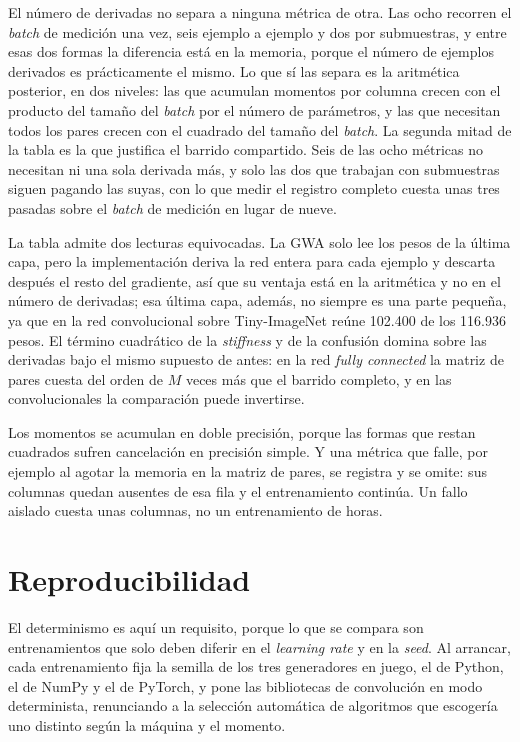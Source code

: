 El número de derivadas no separa a ninguna métrica de otra. Las ocho recorren el \emph{batch} de medición una vez, seis ejemplo a ejemplo y dos por submuestras, y entre esas dos formas la diferencia está en la memoria, porque el número de ejemplos derivados es prácticamente el mismo. Lo que sí las separa es la aritmética posterior, en dos niveles: las que acumulan momentos por columna crecen con el producto del tamaño del \emph{batch} por el número de parámetros, y las que necesitan todos los pares crecen con el cuadrado del tamaño del \emph{batch}. La segunda mitad de la tabla es la que justifica el barrido compartido. Seis de las ocho métricas no necesitan ni una sola derivada más, y solo las dos que trabajan con submuestras siguen pagando las suyas, con lo que medir el registro completo cuesta unas tres pasadas sobre el \emph{batch} de medición en lugar de nueve.

La tabla admite dos lecturas equivocadas. La GWA solo lee los pesos de la última capa, pero la implementación deriva la red entera para cada ejemplo y descarta después el resto del gradiente, así que su ventaja está en la aritmética y no en el número de derivadas; esa última capa, además, no siempre es una parte pequeña, ya que en la red convolucional sobre Tiny-ImageNet reúne 102.400 de los 116.936 pesos. El término cuadrático de la \emph{stiffness} y de la confusión domina sobre las derivadas bajo el mismo supuesto de antes: en la red \emph{fully connected} la matriz de pares cuesta del orden de $M$ veces más que el barrido completo, y en las convolucionales la comparación puede invertirse.

Los momentos se acumulan en doble precisión, porque las formas que restan cuadrados sufren cancelación en precisión simple. Y una métrica que falle, por ejemplo al agotar la memoria en la matriz de pares, se registra y se omite: sus columnas quedan ausentes de esa fila y el entrenamiento continúa. Un fallo aislado cuesta unas columnas, no un entrenamiento de horas.

\section{Reproducibilidad}
\label{sec:reproducibilidad}

El determinismo es aquí un requisito, porque lo que se compara son entrenamientos que solo deben diferir en el \emph{learning rate} y en la \emph{seed}. Al arrancar, cada entrenamiento fija la semilla de los tres generadores en juego, el de Python, el de NumPy y el de PyTorch, y pone las bibliotecas de convolución en modo determinista, renunciando a la selección automática de algoritmos que escogería uno distinto según la máquina y el momento.

